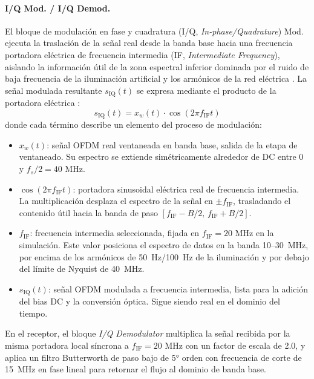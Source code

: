 \paragraph{I/Q Mod. / I/Q Demod.}
El bloque de modulación en fase y cuadratura (I/Q, \textit{In-phase/Quadrature}) Mod. ejecuta la traslación de la señal real desde la banda base hacia una frecuencia portadora eléctrica de frecuencia intermedia (IF, \textit{Intermediate Frequency}), aislando la información útil de la zona espectral inferior dominada por el ruido de baja frecuencia de la iluminación artificial y los armónicos de la red eléctrica \cite{ieee80211bb2023, islim2017modulation}. La señal modulada resultante $s_{\text{IQ}}(t)$ se expresa mediante el producto de la portadora eléctrica \cite{ghassemlooy2019optical}:
\begin{equation}
	s_{\text{IQ}}(t) = x_w(t) \cdot \cos(2 \pi f_{\text{IF}} t)
	\label{eq:sf_if}
\end{equation}
donde cada término describe un elemento del proceso de modulación:
\begin{itemize}
\item $x_w(t)$: señal OFDM real ventaneada en banda base, salida de la etapa de ventaneado. Su espectro se extiende simétricamente alrededor de DC entre 0 y $f_s/2 = 40\text{ MHz}$.
\item $\cos(2 \pi f_{\text{IF}} t)$: portadora sinusoidal eléctrica real de frecuencia intermedia. La multiplicación desplaza el espectro de la señal en $\pm f_{\text{IF}}$, trasladando el contenido útil hacia la banda de paso $[f_{\text{IF}} - B/2,\, f_{\text{IF}} + B/2]$.
\item $f_{\text{IF}}$: frecuencia intermedia seleccionada, fijada en $f_{\text{IF}} = 20\text{ MHz}$ en la simulación. Este valor posiciona el espectro de datos en la banda 10--30~MHz, por encima de los armónicos de 50~Hz/100~Hz de la iluminación y por debajo del límite de Nyquist de 40~MHz.
\item $s_{\text{IQ}}(t)$: señal OFDM modulada a frecuencia intermedia, lista para la adición del bias DC y la conversión óptica. Sigue siendo real en el dominio del tiempo.
\end{itemize}
En el receptor, el bloque \textit{I/Q Demodulator} multiplica la señal recibida por la misma portadora local síncrona a $f_{\text{IF}} = 20\text{ MHz}$ con un factor de escala de 2.0, y aplica un filtro Butterworth de paso bajo de 5° orden con frecuencia de corte de 15~MHz en fase lineal para retornar el flujo al dominio de banda base.

